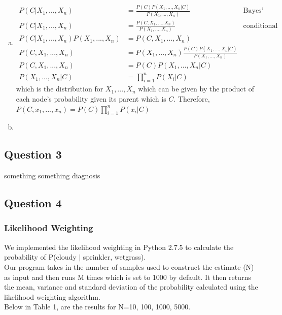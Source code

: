 \documentclass{article}
\begin{document}
\begin{enumerate}[a)]
\item
\begin{align*}
P(C | X_1, \ldots , X_n) &= \frac{P(C) P(X_1, \ldots , X_n | C)}{P(X_1, \ldots , X_n)} & \text{Bayes' Theorem} \\
P(C | X_1, ... , X_n) &= \frac{P(C, X_1, ... , X_n)}{P(X_1, ... , X_n)} & \text{conditional probability} \\
P(C | X_1, ... , X_n) P(X_1, ... , X_n) &= P(C, X_1, ... , X_n) \\
P(C, X_1, ... , X_n) &=  P(X_1, ... , X_n) \frac{P(C) P(X_1, ... , X_n | C)}{P(X_1, ... , X_n)} \\
P(C, X_1, ... , X_n) &=  P(C) P(X_1, ... , X_n | C) \\ 
P(X_1, ... , X_n | C) &=  \prod_{i=1}^n P(X_i | C) 
\end{align*}
which is the distribution for $X_1, ..., X_n$ which can be given by the product of each node's probability given its parent which is $C$.
Therefore,
$P(C, x_1, ... , x_n) =  P(C) \prod_{i=1}^n P(x_i | C) $
\item
\end{enumerate}

\subsection{Question 3}
something something diagnosis

\subsection{Question 4}
\subsubsection{Likelihood Weighting}

We implemented the likelihood weighting in Python 2.7.5 to calculate the probability of P(cloudy $|$ sprinkler, wetgrass). \\

Our program takes in the number of samples used to construct the estimate (N) as input and then runs M times which is set to 1000 by default. It then returns the mean, variance and standard deviation of the probability calculated using the likelihood weighting algorithm.\\

Below in Table 1, are the results for N=10, 100, 1000, 5000.
\end{document}
